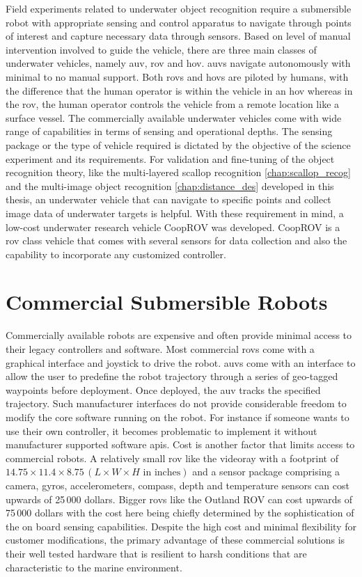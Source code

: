 \documentclass {udthesis}
\begin{document}
Field experiments related to underwater object recognition require a submersible robot with appropriate sensing and control apparatus to navigate through points of interest and capture necessary data through sensors. Based on level of manual intervention involved to guide the vehicle, there are three main classes of underwater vehicles, namely \gls{auv}, \gls{rov} and \gls{hov}. \gls{auv}s navigate autonomously with minimal to no manual support. Both \gls{rov}s and \gls{hov}s are piloted by humans, with the difference that the human operator is within the vehicle in an \gls{hov} whereas in the \gls{rov}, the human operator controls the vehicle from a remote location like a surface vessel. The commercially available underwater vehicles come with wide range of capabilities in terms of sensing and operational depths. The sensing package or the type of vehicle required is dictated by the objective of the science experiment and its requirements. For validation and fine-tuning of the object recognition theory, like 
the multi-layered scallop recognition \ref{chap:scallop_recog} and the multi-image object recognition \ref{chap:distance_des} developed in this thesis, an underwater vehicle that can navigate to specific points and collect image data of underwater targets is helpful. With these requirement in mind, a low-cost underwater research vehicle CoopROV was developed. CoopROV is a \gls{rov} class vehicle that comes with several sensors for data collection and also the capability to incorporate any customized controller.

\section{Commercial Submersible Robots}

Commercially available robots are expensive and often provide minimal access to their legacy controllers and software. Most commercial \gls{rov}s come with a graphical interface and joystick to drive the robot. \gls{auv}s come with an interface to allow the user to predefine the robot trajectory through a series of geo-tagged waypoints before deployment. Once deployed, the \gls{auv} tracks the specified trajectory. Such manufacturer interfaces do not provide considerable freedom to modify the core software running on the robot. For instance if someone wants to use their own controller, it becomes problematic to implement it without manufacturer supported software \gls{api}s. Cost is another factor that limits access to commercial robots. A relatively small \gls{rov} like the videoray \cite{videoray} with a footprint of $14.75\times 11.4\times 8.75 \,(L\times W\times H \text{ in inches})$ and a sensor package comprising a camera, gyros, accelerometers, compass, depth and temperature sensors can cost 
upwards of 25\,000 dollars. Bigger \gls{rov}s like the Outland ROV\cite{outlandrov} can cost upwards of 75\,000 dollars with the cost here being chiefly determined by the sophistication of the on board sensing capabilities. Despite the high cost and minimal flexibility for customer modifications, the primary advantage of these commercial solutions is their well tested hardware that is resilient to harsh conditions that are characteristic to the marine environment.
\end{document}
